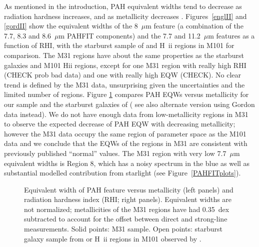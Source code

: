 As mentioned in the introduction, PAH equivalent widths tend to decrease as radiation hardness increases,
and as metallicity decreases \citep{Calzetti:2010fk}.  
Figures~\ref{englII} and \ref{gordII} show the equivalent widths of the  8~$\mu$m feature 
(a combination of the 7.7, 8.3 and 8.6~$\mu$m PAHFIT components) and the 
 7.7 and 11.2~$\mu$m features as a function of RHI, with the starburst sample of \citet{Engelbracht_2008} 
and  H~{\sc ii} regions in M101 \citep{Gordon:2008lr} for comparison.
The M31 regions have about the same properties as the starburst galaxies and M101 H{\sc ii} regions, 
except for one M31 region with really high RHI (CHECK prob bad data) and one with really high EQW (CHECK).
No clear trend is defined by the M31 data, unsurprising given the uncertainties and the limited
number  of regions.
Figure \ref{metalicityVseqw} compares  PAH EQWs  versus  metallicity for our sample and the starburst 
galaxies of \citet{Engelbracht_2008} ( see also alternate version using Gordon data instead). 
We do not have enough data from low-metallicity regions in M31 to observe the expected decrease of PAH EQW with decreasing 
metallicity; however the M31 data occupy the same region of parameter space as the M101 data
and we conclude that the EQWs of the regions in M31 are consistent with previously published ``normal'' values.
The M31 region with very low  7.7~$\mu$m  equivalent widths is Region 8, which has
a noisy spectrum in the blue as well as substantial modelled contribution from starlight (see Figure~\ref{PAHFITplots}).


\begin{figure}
\centering
\caption{Equivalent width of  PAH feature versus metallicity (left panels) and radiation hardness index (RHI; right panels).
Equivalent  widths are not normalized; metallicities of the M31 regions have had 0.35~dex subtracted to account for the offset  between direct and strong-line measurements. 
Solid points: M31 sample. Open points:  starburst galaxy sample from \citet[bottom panels]{Engelbracht_2008} or
 H~{\sc ii} regions in M101 observed  by \citet[middle and top panels]{Gordon:2008lr}.  
}
\label{metalicityVseqw}
\end{figure}



